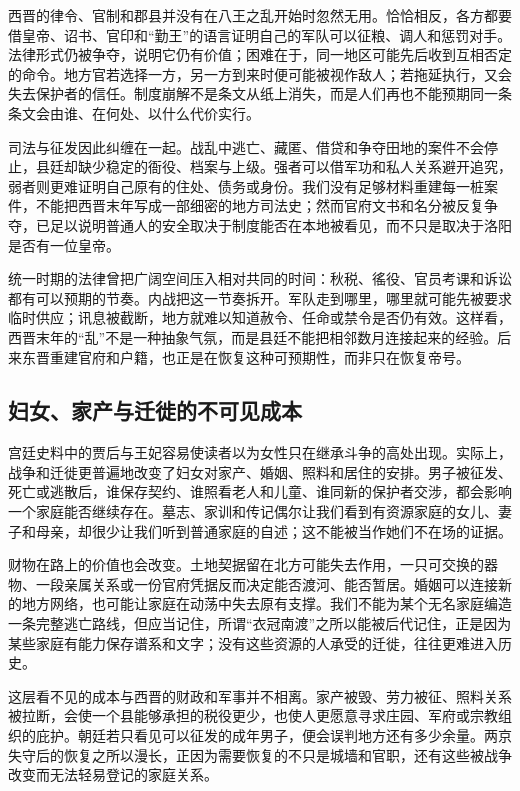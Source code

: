 西晋的律令、官制和郡县并没有在八王之乱开始时忽然无用。恰恰相反，各方都要借皇帝、诏书、官印和“勤王”的语言证明自己的军队可以征粮、调人和惩罚对手。法律形式仍被争夺，说明它仍有价值；困难在于，同一地区可能先后收到互相否定的命令。地方官若选择一方，另一方到来时便可能被视作敌人；若拖延执行，又会失去保护者的信任。制度崩解不是条文从纸上消失，而是人们再也不能预期同一条条文会由谁、在何处、以什么代价实行。

司法与征发因此纠缠在一起。战乱中逃亡、藏匿、借贷和争夺田地的案件不会停止，县廷却缺少稳定的衙役、档案与上级。强者可以借军功和私人关系避开追究，弱者则更难证明自己原有的住处、债务或身份。我们没有足够材料重建每一桩案件，不能把西晋末年写成一部细密的地方司法史；然而官府文书和名分被反复争夺，已足以说明普通人的安全取决于制度能否在本地被看见，而不只是取决于洛阳是否有一位皇帝。

统一时期的法律曾把广阔空间压入相对共同的时间：秋税、徭役、官员考课和诉讼都有可以预期的节奏。内战把这一节奏拆开。军队走到哪里，哪里就可能先被要求临时供应；讯息被截断，地方就难以知道赦令、任命或禁令是否仍有效。这样看，西晋末年的“乱”不是一种抽象气氛，而是县廷不能把相邻数月连接起来的经验。后来东晋重建官府和户籍，也正是在恢复这种可预期性，而非只在恢复帝号。

\subsection{妇女、家产与迁徙的不可见成本}

宫廷史料中的贾后与王妃容易使读者以为女性只在继承斗争的高处出现。实际上，战争和迁徙更普遍地改变了妇女对家产、婚姻、照料和居住的安排。男子被征发、死亡或逃散后，谁保存契约、谁照看老人和儿童、谁同新的保护者交涉，都会影响一个家庭能否继续存在。墓志、家训和传记偶尔让我们看到有资源家庭的女儿、妻子和母亲，却很少让我们听到普通家庭的自述；这不能被当作她们不在场的证据。

财物在路上的价值也会改变。土地契据留在北方可能失去作用，一只可交换的器物、一段亲属关系或一份官府凭据反而决定能否渡河、能否暂居。婚姻可以连接新的地方网络，也可能让家庭在动荡中失去原有支撑。我们不能为某个无名家庭编造一条完整逃亡路线，但应当记住，所谓“衣冠南渡”之所以能被后代记住，正是因为某些家庭有能力保存谱系和文字；没有这些资源的人承受的迁徙，往往更难进入历史。

这层看不见的成本与西晋的财政和军事并不相离。家产被毁、劳力被征、照料关系被拉断，会使一个县能够承担的税役更少，也使人更愿意寻求庄园、军府或宗教组织的庇护。朝廷若只看见可以征发的成年男子，便会误判地方还有多少余量。两京失守后的恢复之所以漫长，正因为需要恢复的不只是城墙和官职，还有这些被战争改变而无法轻易登记的家庭关系。

